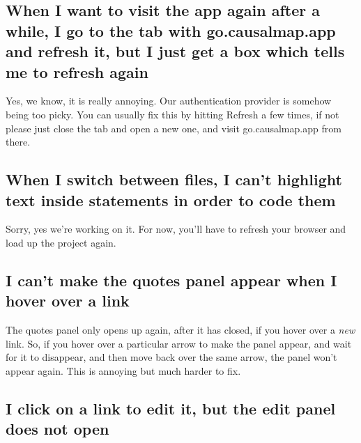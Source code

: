 \documentclass[
]{book}
\begin{document}
\hypertarget{when-i-want-to-visit-the-app-again-after-a-while-i-go-to-the-tab-with-go.causalmap.app-and-refresh-it-but-i-just-get-a-box-which-tells-me-to-refresh-again}{%
\subsection{When I want to visit the app again after a while, I go to the tab with go.causalmap.app and refresh it, but I just get a box which tells me to refresh again}\label{when-i-want-to-visit-the-app-again-after-a-while-i-go-to-the-tab-with-go.causalmap.app-and-refresh-it-but-i-just-get-a-box-which-tells-me-to-refresh-again}}

Yes, we know, it is really annoying. Our authentication provider is somehow being too picky. You can usually fix this by hitting Refresh a few times, if not please just close the tab and open a new one, and visit go.causalmap.app from there.

\hypertarget{when-i-switch-between-files-i-cant-highlight-text-inside-statements-in-order-to-code-them}{%
\subsection{When I switch between files, I can't highlight text inside statements in order to code them}\label{when-i-switch-between-files-i-cant-highlight-text-inside-statements-in-order-to-code-them}}

Sorry, yes we're working on it. For now, you'll have to refresh your browser and load up the project again.

\hypertarget{i-cant-make-the-quotes-panel-appear-when-i-hover-over-a-link}{%
\subsection{I can't make the quotes panel appear when I hover over a link}\label{i-cant-make-the-quotes-panel-appear-when-i-hover-over-a-link}}

The quotes panel only opens up again, after it has closed, if you hover over a \emph{new} link. So, if you hover over a particular arrow to make the panel appear, and wait for it to disappear, and then move back over the same arrow, the panel won't appear again. This is annoying but much harder to fix.

\hypertarget{i-click-on-a-link-to-edit-it-but-the-edit-panel-does-not-open}{%
\subsection{I click on a link to edit it, but the edit panel does not open}\label{i-click-on-a-link-to-edit-it-but-the-edit-panel-does-not-open}}
\end{document}
